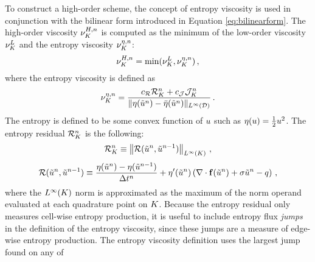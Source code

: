 To construct a high-order scheme, the concept of entropy viscosity is used in
conjunction with the bilinear form introduced in Equation
\eqref{eq:bilinearform}.  The high-order viscosity
$\highordercellviscosity[\timeindex]$ is computed as the minimum of the
low-order viscosity $\lowordercellviscosity$ and the entropy viscosity
$\entropycellviscosity[\timeindex]$:
\begin{equation}\label{eq:high_order_viscosity}
   \highordercellviscosity[\timeindex] = \min(\lowordercellviscosity,
   \entropycellviscosity[\timeindex]) \eqc
\end{equation}
where the entropy viscosity is defined as
\begin{equation}
   \entropycellviscosity[n] = \frac{\entropyresidualcoef
   \entropyresidual_\cellindex^\timeindex
   + \entropyjumpcoef\entropyjump_\cell^\timeindex}
   {\|\entropy(\approximatescalarsolution^\timeindex)
   -\bar{\entropy}(\approximatescalarsolution^\timeindex)\|_{L^\infty(\domain)}}
   \eqp
\end{equation}
The entropy is defined to be some convex function of $\scalarsolution$ such as
$\entropy(\scalarsolution)=\frac{1}{2}\scalarsolution^2$. The entropy residual
$\entropyresidual_\cellindex^\timeindex$ is the following:
\begin{equation}
  \entropyresidual_\cellindex^\timeindex
  \equiv \left\|\entropyresidual(\approximatescalarsolution^\timeindex,
  \approximatescalarsolution^{\timeindex-1})
  \right\|_{L^\infty(\cellindex)} \eqc
\end{equation}
\begin{equation}
  \entropyresidual(\approximatescalarsolution^\timeindex,
  \approximatescalarsolution^{\timeindex-1})
  \equiv \frac{\entropy(\approximatescalarsolution^\timeindex)
  - \entropy(\approximatescalarsolution^{\timeindex-1})} 
  {\timestepsize^\timeindex}
  + \entropy'(\approximatescalarsolution^\timeindex)\pr{
  \divergence\consfluxscalar[\approximatescalarsolution^\timeindex]
  + \reactioncoef \approximatescalarsolution^\timeindex
  - \scalarsource} \eqc
\end{equation}
where the $L^\infty(\cellindex)$ norm is approximated as the maximum of the
norm operand evaluated at each quadrature point on $\cellindex$.  Because the
entropy residual only measures cell-wise entropy production, it is useful to
include entropy flux \emph{jumps} in the definition of the entropy viscosity,
since these jumps are a measure of edge-wise entropy production.
The entropy viscosity definition uses the largest jump found on any of
